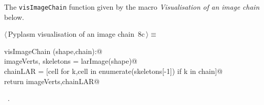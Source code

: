 \documentclass[11pt,oneside]{article}	%
\begin{document}
The \texttt{visImageChain} function given by the macro \emph{Visualisation of an image chain} below. 

\begin{flushleft} \small
\begin{minipage}{\linewidth} \label{scrap14}
\protect{}$\langle\,$Pyplasm visualisation of an image chain\nobreak\ {\footnotesize 8c}$\,\rangle\equiv$
\vspace{-1ex}
\begin{list}{}{} \item
\mbox{}\verb@def visImageChain (shape,chain):@\\
\mbox{}\verb@   imageVerts, skeletons = larImage(shape)@\\
\mbox{}\verb@   chainLAR = [cell for k,cell in enumerate(skeletons[-1]) if k in chain]@\\
\mbox{}\verb@   return imageVerts,chainLAR@\\
\mbox{}\verb@@{\NWsep}
\end{list}
\vspace{-1ex}
\footnotesize\addtolength{\baselineskip}{-1ex}
\begin{list}{}{\setlength{\itemsep}{-\parsep}\setlength{\itemindent}{-\leftmargin}}
\item \NWtxtMacroRefIn\ .
\end{list}
\end{minipage}\\[4ex]
\end{flushleft}
\end{document}

